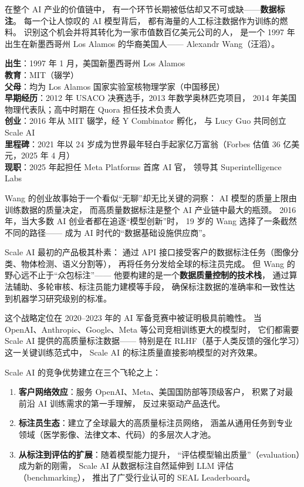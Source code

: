 在整个 AI 产业的价值链中，
有一个环节长期被低估却又不可或缺——\textbf{数据标注}。
每一个让人惊叹的 AI 模型背后，
都有海量的人工标注数据作为训练的燃料。
识别这个机会并将其转化为一家市值数百亿美元公司的人，
是一个 1997 年出生在新墨西哥州 Los Alamos 的华裔美国人——
Alexandr Wang（汪滔）。

\begin{corebox}
\textbf{出生}：1997 年 1 月，美国新墨西哥州 Los Alamos\\
\textbf{教育}：MIT（辍学）\\
\textbf{父母}：均为 Los Alamos 国家实验室核物理学家（中国移民）\\
\textbf{早期经历}：2012 年 USACO 决赛选手，2013 年数学奥林匹克项目，
2014 年美国物理代表队；高中时期在 Quora 担任技术负责人\\
\textbf{创业}：2016 年从 MIT 辍学，经 Y Combinator 孵化，
与 Lucy Guo 共同创立 Scale AI\\
\textbf{里程碑}：2021 年以 24 岁成为世界最年轻白手起家亿万富翁（Forbes 估值 36 亿美元，2025 年 4 月）\\
\textbf{现职}：2025 年起担任 Meta Platforms 首席 AI 官，
领导其 Superintelligence Labs
\end{corebox}

Wang 的创业故事始于一个看似``无聊''却无比关键的洞察：
AI 模型的质量上限由训练数据的质量决定，
而高质量数据标注是整个 AI 产业链中最大的瓶颈。
2016 年，当大多数 AI 创业者都在追逐``模型创新''时，
19 岁的 Wang 选择了一条截然不同的路径——
成为 AI 时代的``数据基础设施供应商''。

Scale AI 最初的产品极其朴素：
通过 API 接口接受客户的数据标注任务（图像分类、物体检测、语义分割等），
再将任务分发给全球的标注员完成。
但 Wang 的野心远不止于``众包标注''——
他要构建的是一个\textbf{数据质量控制的技术栈}，
通过算法辅助、多轮审核、标注员能力建模等手段，
确保标注数据的准确率和一致性达到机器学习研究级别的标准。

这个战略定位在 2020--2023 年的 AI 军备竞赛中被证明极具前瞻性。
当 OpenAI、Anthropic、Google、Meta 等公司竞相训练更大的模型时，
它们都需要 Scale AI 提供的高质量标注数据——
特别是在 RLHF（基于人类反馈的强化学习）这一关键训练范式中，
Scale AI 的标注质量直接影响模型的对齐效果。

\begin{whybox}
Scale AI 的竞争优势建立在三个飞轮之上：
\begin{enumerate}[noitemsep]
  \item \textbf{客户网络效应}：服务 OpenAI、Meta、美国国防部等顶级客户，
        积累了对最前沿 AI 训练需求的第一手理解，
        反过来驱动产品迭代。
  \item \textbf{标注员生态}：建立了全球最大的高质量标注员网络，
        涵盖从通用任务到专业领域（医学影像、法律文本、代码）的多层次人才池。
  \item \textbf{从标注到评估的扩展}：随着模型能力提升，
        ``评估模型输出质量''（evaluation）成为新的刚需，
        Scale AI 从数据标注自然延伸到 LLM 评估（benchmarking），
        推出了广受行业认可的 SEAL Leaderboard。
\end{enumerate}
\end{whybox}

